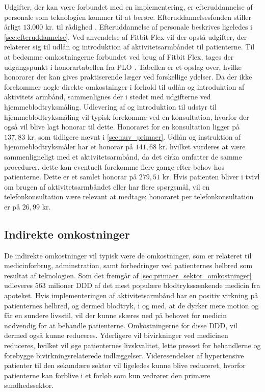 Udgifter, der kan være forbundet med en implementering, er efteruddannelse af personale som teknologien kommer til at berøre. Efteruddannelsesfonden stiller årligt $13.000$ kr. til rådighed \citep{vedsted2005}. Efteruddannelse af personale beskrives ligeledes i \autoref{sec:efteruddannelse}.   
Ved anvendelse af Fitbit Flex vil der opstå udgifter, der relaterer sig til udlån og introduktion af aktivitetsarmbåndet til patienterne. Til at bedømme omkostningerne forbundet ved brug af Fitbit Flex, tages der udgangspunkt i honorartabellen fra PLO \citep{honorartabel2016}. Tabellen er et opslag over, hvilke honorarer der kan gives praktiserende læger ved forskellige ydelser.
Da der ikke forekommer nogle direkte omkostninger i forhold til udlån og introduktion af aktivitets armbånd, sammenlignes der i stedet med udgifterne ved hjemmeblodtryksmåling. Udlevering af og introduktion til udstyr til hjemmeblodtryksmåling vil typisk forekomme ved en konsultation, hvorfor der også vil blive lagt honorar til dette. Honoraret for en konsultation ligger på $137,83$ kr. som tidligere nævnt i \autoref{sec:nuv_primaer}. Udlån og instruktion af hjemmeblodtryksmåler har et honorar på $141,68$ kr. hvilket vurderes at være sammenligneligt med et aktivitetsarmbånd, da det cirka omfatter de samme procedurer, dette kan eventuelt forekomme flere gange efter behov hos patienterne. Dette er et samlet honorar på $279,51$ kr. Hvis patienten bliver i tvivl om brugen af aktivitetsarmbåndet eller har flere spørgsmål, vil en telefonkonsultation være relevant at medtage; honoraret per telefonkonsultation er på $26,99$ kr.

\subsection{Indirekte omkostninger} \label{sec:indir_omkost}
De indirekte omkostninger vil typisk være de omkostninger, som er relateret til medicinforbrug, adminstration, samt forbedringer ved patienternes helbred som resultat af teknologien. 
Som det fremgår af \autoref{sec:primaer_sektor_omkostninger} udleveres $563$ milioner DDD af det mest populære blodtrykssænkende medicin fra apoteket. Hvis implementeringen af aktivitetsarmbånd har en positiv virkning på patienternes helbred, og dermed blodtryk, i og med, at de dyrker mere motion og får en sundere livsstil, vil der kunne skæres ned på behovet for medicin nødvendig for at behandle patienterne. Omkostningerne for disse DDD, vil dermed også kunne reduceres. Yderligere vil bivirkninger ved medicinen reduceres, hvilket vil øge patienternes livskvalitet, lette presset for behandlerne og forebygge bivirkningsrelaterede indlæggelser. 
Videresendelser af hypertensive patienter til den sekundære sektor vil ligeledes kunne blive reduceret, hvorfor patienterne kan forblive i et forløb som kun vedrører den primære sundhedssektor.   %

